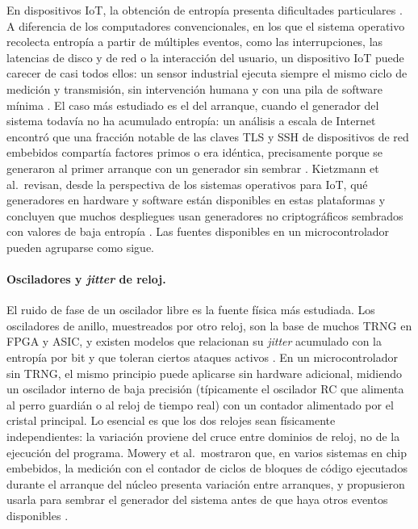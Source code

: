 En dispositivos IoT, la obtención de entropía presenta dificultades particulares \cite{Seyhan2022ClassificationTaxonomy,Kietzmann2021PRNGIoT}. A diferencia de los computadores convencionales, en los que el sistema operativo recolecta entropía a partir de múltiples eventos, como las interrupciones, las latencias de disco y de red o la interacción del usuario, un dispositivo IoT puede carecer de casi todos ellos: un sensor industrial ejecuta siempre el mismo ciclo de medición y transmisión, sin intervención humana y con una pila de software mínima \cite{Klimushyn2022Crypto-ResistantDevices}. El caso más estudiado es el del arranque, cuando el generador del sistema todavía no ha acumulado entropía: un análisis a escala de Internet encontró que una fracción notable de las claves TLS y SSH de dispositivos de red embebidos compartía factores primos o era idéntica, precisamente porque se generaron al primer arranque con un generador sin sembrar \cite{Heninger2012MiningPsQs}. Kietzmann et al.\ revisan, desde la perspectiva de los sistemas operativos para IoT, qué generadores en hardware y software están disponibles en estas plataformas y concluyen que muchos despliegues usan generadores no criptográficos sembrados con valores de baja entropía \cite{Kietzmann2021PRNGIoT}. Las fuentes disponibles en un microcontrolador pueden agruparse como sigue.

\paragraph{Osciladores y \textit{jitter} de reloj.} El ruido de fase de un oscilador libre es la fuente física más estudiada. Los osciladores de anillo, muestreados por otro reloj, son la base de muchos TRNG en FPGA y ASIC, y existen modelos que relacionan su \textit{jitter} acumulado con la entropía por bit y que toleran ciertos ataques activos \cite{Sunar2007ProvablySecureTRNG}. En un microcontrolador sin TRNG, el mismo principio puede aplicarse sin hardware adicional, midiendo un oscilador interno de baja precisión (típicamente el oscilador RC que alimenta al perro guardián o al reloj de tiempo real) con un contador alimentado por el cristal principal. Lo esencial es que los dos relojes sean físicamente independientes: la variación proviene del cruce entre dominios de reloj, no de la ejecución del programa. Mowery et al.\ mostraron que, en varios sistemas en chip embebidos, la medición con el contador de ciclos de bloques de código ejecutados durante el arranque del núcleo presenta variación entre arranques, y propusieron usarla para sembrar el generador del sistema antes de que haya otros eventos disponibles \cite{Mowery2013Entropics}.

